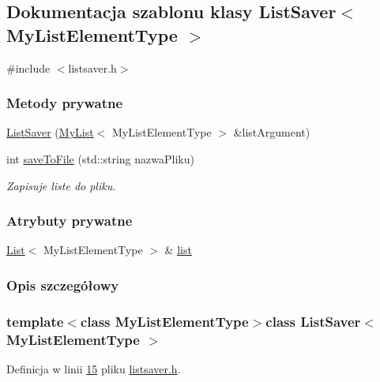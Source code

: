 \hypertarget{class_list_saver}{\subsection{Dokumentacja szablonu klasy List\-Saver$<$ My\-List\-Element\-Type $>$}
\label{class_list_saver}
}


{\ttfamily \#include $<$listsaver.\-h$>$}

\subsubsection*{Metody prywatne}
\begin{DoxyCompactItemize}
\item 
\hyperlink{class_list_saver_a21653fc0fc232e603b8fc47e165e771e}{List\-Saver} (\hyperlink{class_my_list}{My\-List}$<$ My\-List\-Element\-Type $>$ \&list\-Argument)
\item 
int \hyperlink{class_list_saver_ac00160bf49e4981df4aec73ad479fc53}{save\-To\-File} (std\-::string nazwa\-Pliku)
\begin{DoxyCompactList}\small\item\em Zapisuje liste do pliku. \end{DoxyCompactList}\end{DoxyCompactItemize}
\subsubsection*{Atrybuty prywatne}
\begin{DoxyCompactItemize}
\item 
\hyperlink{class_list}{List}$<$ My\-List\-Element\-Type $>$ \& \hyperlink{class_list_saver_ac803162ee7ee2580226d530f89683ecb}{list}
\end{DoxyCompactItemize}


\subsubsection{Opis szczegółowy}
\subsubsection*{template$<$class My\-List\-Element\-Type$>$class List\-Saver$<$ My\-List\-Element\-Type $>$}



Definicja w linii \hyperlink{listsaver_8h_source_l00015}{15} pliku \hyperlink{listsaver_8h_source}{listsaver.\-h}.



